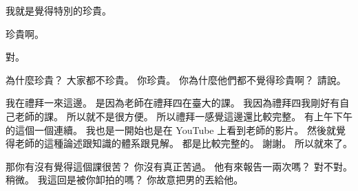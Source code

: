 \hypertarget{w01:cue:3913}{}我就是覺得特別的珍貴。

\hypertarget{w01:cue:3914}{}珍貴啊。

\hypertarget{w01:cue:3915}{}對。

\hypertarget{w01:cue:3916}{}為什麼珍貴？
\hypertarget{w01:cue:3917}{}大家都不珍貴。
\hypertarget{w01:cue:3918}{}你珍貴。
\hypertarget{w01:cue:3919}{}你為什麼他們都不覺得珍貴啊？
\hypertarget{w01:cue:3920}{}請說。

\hypertarget{w01:cue:3921}{}我在禮拜一來這邊。
\hypertarget{w01:cue:3922}{}是因為老師在禮拜四在臺大的課。
\hypertarget{w01:cue:3923}{}我因為禮拜四我剛好有自己老師的課。
\hypertarget{w01:cue:3924}{}所以就不是很方便。
\hypertarget{w01:cue:3925}{}所以禮拜一感覺這邊還比較完整。
\hypertarget{w01:cue:3926}{}有上午下午的這個一個連續。
\hypertarget{w01:cue:3927}{}我也是一開始也是在 YouTube 上看到老師的影片。
\hypertarget{w01:cue:3928}{}然後就覺得老師的這種論述跟知識的體系跟見解。
\hypertarget{w01:cue:3929}{}都是比較完整的。
\hypertarget{w01:cue:3930}{}謝謝。
\hypertarget{w01:cue:3931}{}所以就來了。

\hypertarget{w01:cue:3932}{}那你有沒有覺得這個課很苦？
\hypertarget{w01:cue:3933}{}你沒有真正苦過。
\hypertarget{w01:cue:3934}{}他有來報告一兩次嗎？
\hypertarget{w01:cue:3935}{}對不對。
\hypertarget{w01:cue:3936}{}稍微。
\hypertarget{w01:cue:3937}{}我這回是被你卸拍的嗎？
\hypertarget{w01:cue:3938}{}你故意把男的丟給他。

